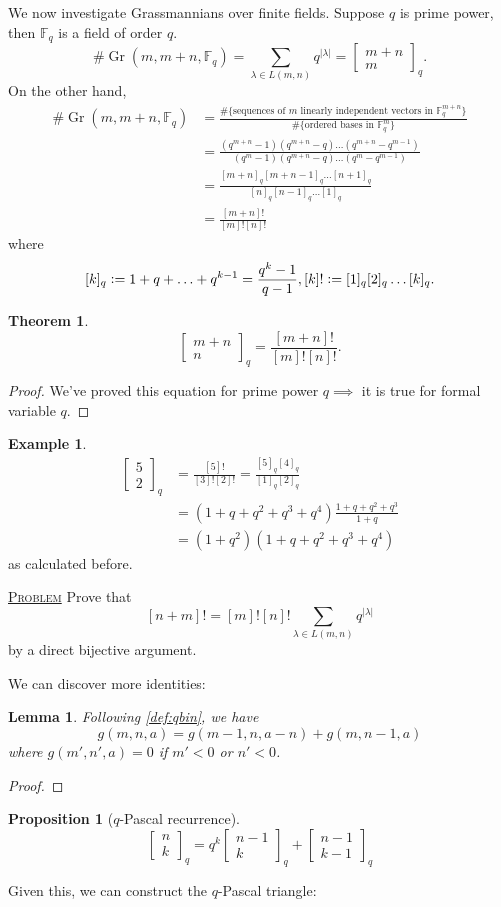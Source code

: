 \documentclass{report}
\newcommand{\F}{\mathbb{F}}
\def \Gr {\operatorname{Gr}}
\newcommand{\qbin}[2]{\begin{bmatrix}{#1}\\ {#2}\end{bmatrix}_q}
\newcommand{\defeq}{\vcentcolon=}
\newcommand{\fancyem}[1]{\underline{\textsc{#1}}}
\newtheorem{theorem}{Theorem}[section]
\newtheorem{lemma}{Lemma}[section]
\newtheorem{proposition}{Proposition}[section]
\theoremstyle{definition}
\newtheorem{example}{Example}[section]
\theoremstyle{remark}
\numberwithin{equation}{section}
\newcommand{\fnl}{\parbox[t]{0\linewidth}{}}
\begin{document}
We now investigate Grassmannians over finite fields. Suppose $q$ is prime power, then $\F_q$ is a field of order $q$. 
\[
    \# \Gr(m, m+n, \F_q) = \sum_{\lambda \in L(m, n)}q^{|\lambda|} = \qbin{m+n}{m}.    
\] On the other hand, \begin{align*}
    \# \Gr(m, m+n, \F_q) & = \frac{\#\{\text{sequences of $m$ linearly independent vectors in $\F_q^{m + n}$}\}}{\#\{\text{ordered bases in $\F_q^m$}\}} \\
    & = \frac{(q^{m+n} - 1)(q^{m+n} - q)\ldots(q^{m+n} - q^{m-1})}{(q^{m} - 1)(q^{m+n} - q)\ldots(q^{m} - q^{m-1})} \\
    & = \frac{[m+n]_q[m+n-1]_q\ldots[n+1]_q}{[n]_q[n-1]_q\ldots[1]_q} \\
    & = \frac{[m+n]!}{[m]![n]!}
\end{align*}
where \[
    [k]_q \defeq 1 + q + \ldots + q^{k-1} = \frac{q^k - 1}{q - 1}, [k]! \defeq [1]_q[2]_q\ldots[k]_q.
\]
\begin{theorem}\fnl
    \[\qbin{m+n}{n} = \frac{[m+n]!}{[m]![n]!}.\]
\end{theorem}
\begin{proof}
We've proved this equation for prime power $q \implies$ it is true for formal variable $q$. 
\end{proof}
\begin{example}
    \begin{align*}
        \qbin{5}{2} & = \frac{[5]!}{[3]![2]!} = \frac{[5]_q[4]_q}{[1]_q[2]_q}\\
        & = (1 + q + q^2 + q^3 + q^4)\frac{1 + q + q^2 + q^3}{1 + q} \\
        & = (1 + q^2)(1 + q + q^2 + q^3 + q^4)
    \end{align*}
    as calculated before.
\end{example}
\fancyem{Problem} Prove that \[
    [n + m]! = [m]![n]!\sum_{\lambda \in L(m, n)}q^{|\lambda|}    
\] by a direct bijective argument.

We can discover more identities:
\begin{lemma}Following \autoref{def:qbin}, we have
    \[g(m, n, a) = g(m - 1, n, a - n) + g(m, n - 1, a)\]
    where $g(m', n', a) = 0$ if $m' < 0$ or $n' < 0$.
\end{lemma}
\begin{proof}
\end{proof}
\begin{proposition}[$q$-Pascal recurrence]\fnl
    \[\qbin{n}{k} = q^k\qbin{n-1}{k} + \qbin{n-1}{k-1}\]
\end{proposition}
Given this, we can construct the $q$-Pascal triangle:
\end{document}
